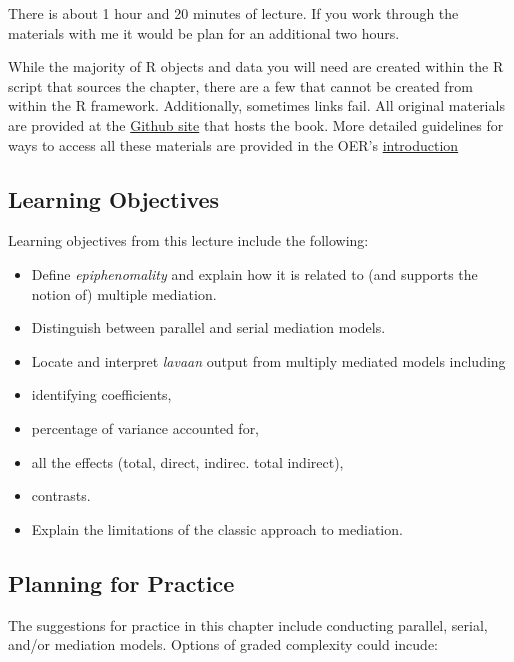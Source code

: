 \documentclass[
  11pt,
]{book}
\providecommand{\tightlist}{%
  \setlength{\itemsep}{0pt}\setlength{\parskip}{0pt}}
\begin{document}
There is about 1 hour and 20 minutes of lecture. If you work through the materials with me it would be plan for an additional two hours.

While the majority of R objects and data you will need are created within the R script that sources the chapter, there are a few that cannot be created from within the R framework. Additionally, sometimes links fail. All original materials are provided at the \href{https://https://github.com/lhbikos/ReC_MultivModel}{Github site} that hosts the book. More detailed guidelines for ways to access all these materials are provided in the OER's \protect\hyperlink{ReCintro}{introduction}

\hypertarget{learning-objectives-5}{%
\subsection{Learning Objectives}\label{learning-objectives-5}}

Learning objectives from this lecture include the following:

\begin{itemize}
\tightlist
\item
  Define \emph{epiphenomality} and explain how it is related to (and supports the notion of) multiple mediation.
\item
  Distinguish between parallel and serial mediation models.
\item
  Locate and interpret \emph{lavaan} output from multiply mediated models including
\item
  identifying coefficients,
\item
  percentage of variance accounted for,\\
\item
  all the effects (total, direct, indirec. total indirect),
\item
  contrasts.
\item
  Explain the limitations of the classic approach \citep{baron_moderator-mediator_1986} to mediation.
\end{itemize}

\hypertarget{planning-for-practice-5}{%
\subsection{Planning for Practice}\label{planning-for-practice-5}}

The suggestions for practice in this chapter include conducting parallel, serial, and/or mediation models. Options of graded complexity could incude:
\end{document}
